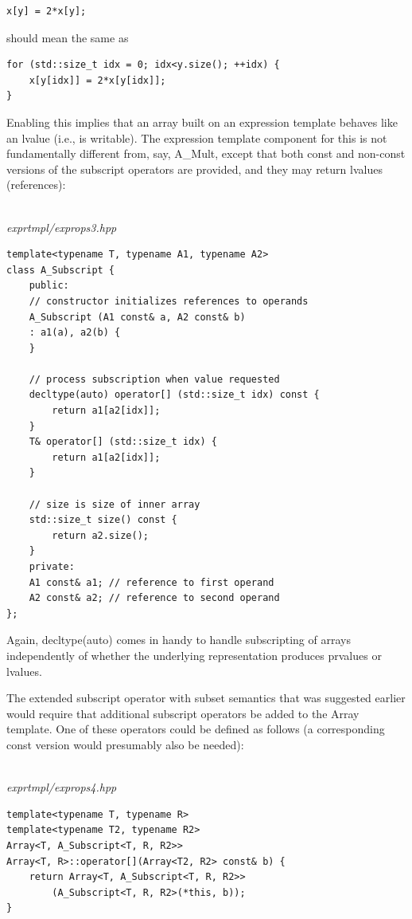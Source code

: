 \begin{lstlisting}[style=styleCXX]
x[y] = 2*x[y];
\end{lstlisting}

should mean the same as

\begin{lstlisting}[style=styleCXX]
for (std::size_t idx = 0; idx<y.size(); ++idx) {
	x[y[idx]] = 2*x[y[idx]];
}
\end{lstlisting}

Enabling this implies that an array built on an expression template behaves like an lvalue (i.e., is writable). The expression template component for this is not fundamentally different from, say, A\_Mult, except that both const and non-const versions of the subscript operators are provided, and they may return lvalues (references):

\hspace*{\fill} \\ %
\noindent
\textit{exprtmpl/exprops3.hpp}
\begin{lstlisting}[style=styleCXX]
template<typename T, typename A1, typename A2>
class A_Subscript {
	public:
	// constructor initializes references to operands
	A_Subscript (A1 const& a, A2 const& b)
	: a1(a), a2(b) {
	}

	// process subscription when value requested
	decltype(auto) operator[] (std::size_t idx) const {
		return a1[a2[idx]];
	}
	T& operator[] (std::size_t idx) {
		return a1[a2[idx]];
	}

	// size is size of inner array
	std::size_t size() const {
		return a2.size();
	}
	private:
	A1 const& a1; // reference to first operand
	A2 const& a2; // reference to second operand
};
\end{lstlisting}

Again, decltype(auto) comes in handy to handle subscripting of arrays independently of whether the underlying representation produces prvalues or lvalues.

The extended subscript operator with subset semantics that was suggested earlier would require that additional subscript operators be added to the Array template. One of these operators could be defined as follows (a corresponding const version would presumably also be needed):

\hspace*{\fill} \\ %
\noindent
\textit{exprtmpl/exprops4.hpp}
\begin{lstlisting}[style=styleCXX]
template<typename T, typename R>
template<typename T2, typename R2>
Array<T, A_Subscript<T, R, R2>>
Array<T, R>::operator[](Array<T2, R2> const& b) {
	return Array<T, A_Subscript<T, R, R2>>
		(A_Subscript<T, R, R2>(*this, b));
}
\end{lstlisting}













